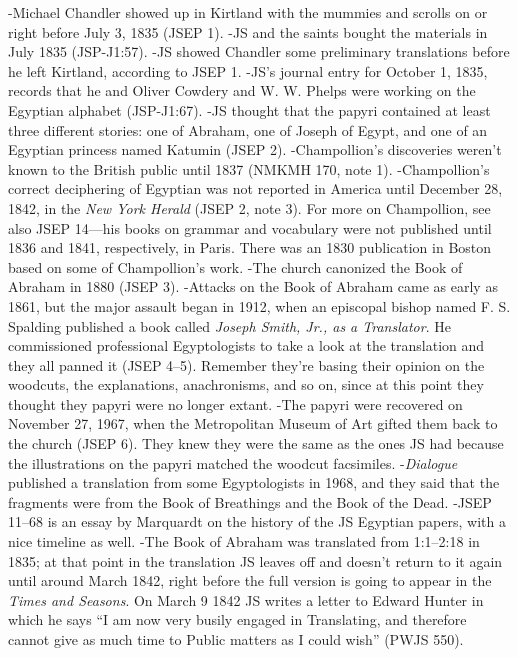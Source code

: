 		\begin{compactitem}
			\item -Michael Chandler showed up in Kirtland with the mummies and scrolls on or right before July 3, 1835 (JSEP 1).
		-JS and the saints bought the materials in July 1835 (JSP-J1:57).
		-JS showed Chandler some preliminary translations before he left Kirtland, according to JSEP 1.
		-JS's journal entry for October 1, 1835, records that he and Oliver Cowdery and W. W. Phelps were working on the Egyptian alphabet (JSP-J1:67).
		-JS thought that the papyri contained at least three different stories: one of Abraham, one of Joseph of Egypt, and one of an Egyptian princess named Katumin (JSEP 2).
		-Champollion's discoveries weren't known to the British public until 1837 (NMKMH 170, note 1).
		-Champollion's correct deciphering of Egyptian was not reported in America until December 28, 1842, in the \textit{New York Herald} (JSEP 2, note 3).
			For more on Champollion, see also JSEP 14---his books on grammar and vocabulary were not published until 1836 and 1841, respectively, in Paris. There was an 1830 publication in Boston based on some of Champollion's work.
		-The church canonized the Book of Abraham in 1880 (JSEP 3).
		-Attacks on the Book of Abraham came as early as 1861, but the major assault began in 1912, when an episcopal bishop named F. S. Spalding published a book called \textit{Joseph Smith, Jr., as a Translator}. He commissioned professional Egyptologists to take a look at the translation and they all panned it (JSEP 4--5). Remember they're basing their opinion on the woodcuts, the explanations, anachronisms, and so on, since at this point they thought they papyri were no longer extant.
		-The papyri were recovered on November 27, 1967, when the Metropolitan Museum of Art gifted them back to the church (JSEP 6). They knew they were the same as the ones JS had because the illustrations on the papyri matched the woodcut facsimiles.
		-\textit{Dialogue} published a translation from some Egyptologists in 1968, and they said that the fragments were from the Book of Breathings and the Book of the Dead.
		-JSEP 11--68 is an essay by Marquardt on the history of the JS Egyptian papers, with a nice timeline as well.
		-The Book of Abraham was translated from 1:1--2:18 in 1835; at that point in the translation JS leaves off and doesn't return to it again until around March 1842, right before the full version is going to appear in the \textit{Times and Seasons}.
			On March 9 1842 JS writes a letter to Edward Hunter in which he says ``I am now very busily engaged in Translating, and therefore cannot give as much time to Public matters as I could wish'' (PWJS 550).

\end{compactitem}
